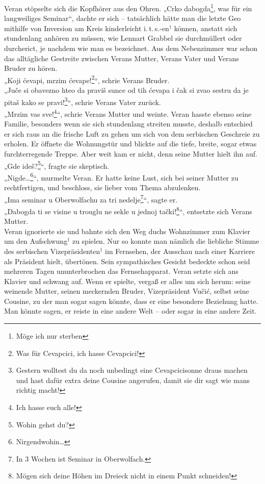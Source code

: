 \documentclass[oneside]{memoir}
\begin{document}
\noindent Veran stöpselte sich die Kopfhörer aus den Ohren. „Crko dabogda\footnote{Möge ich nur sterben}, was für ein langweiliges Seminar“, dachte er sich -- tatsächlich hätte man die letzte Geo mithilfe von Inversion am Kreis kinderleicht i.\,t.\,s.-en$^{\dagger}$ können, anstatt sich stundenlang anhören zu müssen, wie Lennart Grabbel sie durchmüllert oder durcherict, je nachdem wie man es bezeichnet. Aus dem Nebenzimmer war schon das alltägliche Gestreite zwischen Verans Mutter, Verans Vater und Verans Bruder zu hören. \\
„Koji ćevapi, mrzim ćevape!\footnote{Was für Cevapcici, ich hasse Cevapcici!}“, schrie Verans Bruder. \\
„Juče si obavezno hteo da praviš sunce od tih ćevapa i čak si zvao sestru da je pitaš kako se pravi!\footnote{Gestern wolltest du da noch unbedingt eine Cevapcicisonne draus machen und hast dafür extra deine Cousine angerufen, damit sie dir sagt wie mans richtig macht!}“, schrie Verans Vater zurück. \\
„Mrzim vas sve!\footnote{Ich hasse euch alle!}“, schrie Verans Mutter und weinte. Veran hasste ebenso seine Familie, besonders wenn sie sich stundenlang streiten musste, deshalb entschied er sich raus an die frische Luft zu gehen um sich von dem serbischen Geschreie zu erholen. Er öffnete die Wohnungstür und blickte auf die tiefe, breite, sogar etwas furchterregende Treppe. Aber weit kam er nicht, denn seine Mutter hielt ihn auf. \\
„Gde ideš?\footnote{Wohin gehst du?}“, fragte sie skeptisch. \\
„Nigde\ldots\footnote{Nirgendwohin\ldots}“, murmelte Veran. Er hatte keine Lust, sich bei seiner Mutter zu rechtfertigen, und beschloss, sie lieber vom Thema abzulenken. \\
„Ima seminar u Oberwolfachu za tri nedelje\footnote{In 3 Wochen ist Seminar in Oberwolfach.}“, sagte er. \\
„Dabogda ti se visine u trouglu ne sekle u jednoj tački!\footnote{Mögen sich deine Höhen im Dreieck nicht in einem Punkt schneiden!}“, entsetzte sich Verans Mutter. \\
Veran ignorierte sie und bahnte sich den Weg duchs Wohnzimmer zum Klavier um den Aufschwung$^{\dagger}$ zu spielen. Nur so konnte man nämlich die liebliche Stimme des serbischen Vizepräsidenten$^{\dagger}$ im Fernsehen, der Ausschau nach einer Karriere als Präsident hielt, übertönen. Sein sympathisches Gesicht bedeckte schon seid mehreren Tagen ununterbrochen das Fernsehapparat. Veran setzte sich ans Klavier und schwang auf. Wenn er spielte, vergaß er alles um sich herum: seine weinende Mutter, seinen meckernden Bruder, Vizepräsident Vučić, selbst seine Cousine, zu der man sogar sagen könnte, dass er eine besondere Beziehung hatte. Man könnte sagen, er reiste in eine andere Welt -- oder sogar in eine andere Zeit.
\end{document}
